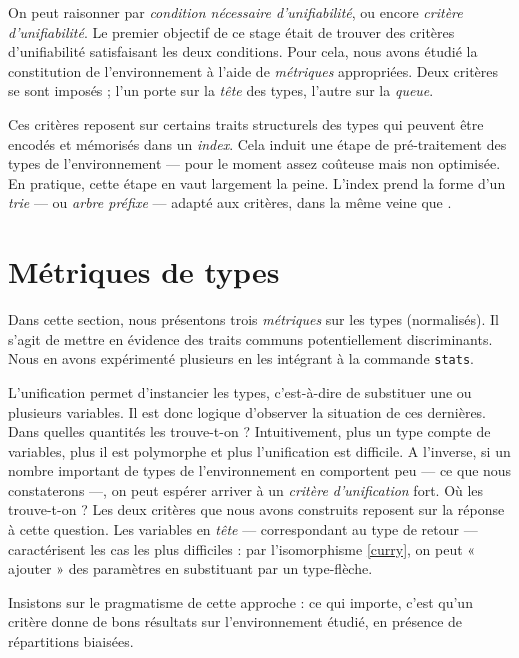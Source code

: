 \documentclass[a4paper]{report}
\theoremstyle{definition}
\begin{document}
On peut raisonner par \emph{condition nécessaire d'unifiabilité}, ou encore \emph{critère d'unifiabilité}. Le premier objectif de ce stage était de trouver des critères d'unifiabilité satisfaisant les deux conditions. Pour cela, nous avons étudié la constitution de l'environnement à l'aide de \emph{métriques} appropriées. Deux critères se sont imposés ; l'un porte sur la \emph{tête} des types, l'autre sur la \emph{queue}.

Ces critères reposent sur certains traits structurels des types qui peuvent être encodés et mémorisés dans un \emph{index}. Cela induit une étape de pré-traitement des types de l'environnement — pour le moment assez coûteuse mais non optimisée. En pratique, cette étape en vaut largement la peine. L'index prend la forme d'un \emph{trie} — ou \emph{arbre préfixe} — adapté aux critères, dans la même veine que \cite{Schulz}.


\section{Métriques de types}

Dans cette section, nous présentons trois \emph{métriques} sur les types (normalisés). Il s'agit de mettre en évidence des traits communs potentiellement discriminants. Nous en avons expérimenté plusieurs en les intégrant à la commande \texttt{stats}.

L'unification permet d'instancier les types, c'est-à-dire de substituer une ou plusieurs variables. Il est donc logique d'observer la situation de ces dernières. Dans quelles quantités les trouve-t-on ? Intuitivement, plus un type compte de variables, plus il est polymorphe et plus l'unification est difficile. A l'inverse, si un nombre important de types de l'environnement en comportent peu — ce que nous constaterons —, on peut espérer arriver à un \emph{critère d'unification} fort. Où les trouve-t-on ? Les deux critères que nous avons construits reposent sur la réponse à cette question. Les variables en \emph{tête} — correspondant au type de retour — caractérisent les cas les plus difficiles : par l'isomorphisme \eqref{curry}, on peut « ajouter » des paramètres en substituant par un type-flèche.

Insistons sur le pragmatisme de cette approche : ce qui importe, c'est qu'un critère donne de bons résultats sur l'environnement étudié, en présence de répartitions biaisées.
\end{document}

